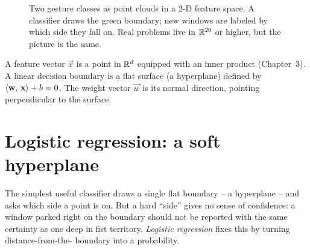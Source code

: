 \begin{figure}[H]
\centering
{}
\caption{Two gesture classes as point clouds in a 2-D feature space. A classifier
draws the green boundary; new windows are labeled by which side they fall on. Real
problems live in $\mathbb{R}^{20}$ or higher, but the picture is the same.}
\label{ch39:fig-feature-space}
\end{figure}

\begin{connectionbox}
A feature vector $\vec{x}$ is a point in $\mathbb{R}^d$ equipped with an inner product (Chapter~3). A linear decision boundary is a flat surface (a hyperplane) defined by
$\langle \mathbf{w},\, \mathbf{x} \rangle + b = 0$. The weight vector $\vec{w}$ is its normal direction, pointing perpendicular to the surface.
\end{connectionbox}

\section{Logistic regression: a soft hyperplane}
\label{ch39:logistic}

The simplest useful classifier draws a single flat boundary -- a hyperplane -- and asks
which side a point is on. But a hard ``side'' gives no sense of confidence: a window
parked right on the boundary should not be reported with the same certainty as one deep
in fist territory. \emph{Logistic regression} fixes this by turning distance-from-the-
boundary into a probability.


